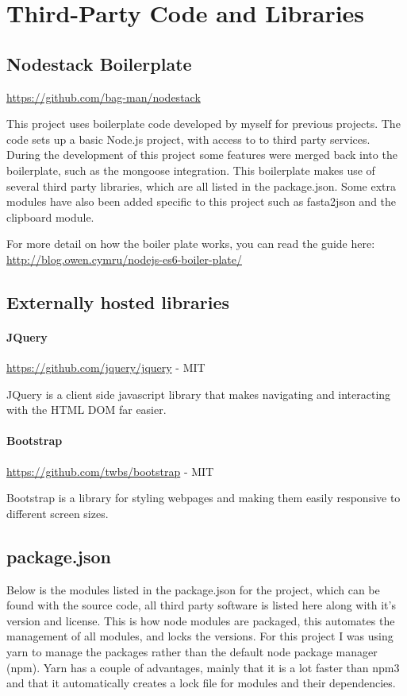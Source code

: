 \chapter{Third-Party Code and Libraries}
\section{Nodestack Boilerplate}

\url{https://github.com/bag-man/nodestack}

This project uses boilerplate code developed by myself for previous projects. The code sets up a basic Node.js project, with access to to third party services. During the development of this project some features were merged back into the boilerplate, such as the mongoose integration.  This boilerplate makes use of several third party libraries, which are all listed in the package.json. Some extra modules have also been added specific to this project such as fasta2json and the clipboard module. 

For more detail on how the boiler plate works, you can read the guide here: \url{http://blog.owen.cymru/nodejs-es6-boiler-plate/}

\section{Externally hosted libraries}
\subsubsection*{JQuery} 

\url{https://github.com/jquery/jquery} - MIT

JQuery is a client side javascript library that makes navigating and interacting with the HTML DOM far easier. 

\subsubsection*{Bootstrap} 

\url{https://github.com/twbs/bootstrap} - MIT

Bootstrap is a library for styling webpages and making them easily responsive to different screen sizes.

\section{package.json}
Below is the modules listed in the package.json for the project, which can be found with the source code, all third party software is listed here along with it's version and license. This is how node modules are packaged, this automates the management of all modules, and locks the versions. For this project I was using yarn\cite{yarn} to manage the packages rather than the default node package manager (npm)\cite{npm}. Yarn has a couple of advantages, mainly that it is a lot faster than npm3 and that it automatically creates a lock file for modules and their dependencies. 

